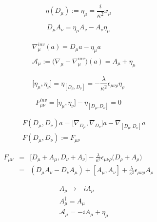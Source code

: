 \documentclass[10pt]{book}
\theoremstyle{break}
\begin{document}
\begin{equation*}
 \eta(D_\mu) := \eta_\mu = \frac{i}{\kappa^2} x_\mu
\end{equation*}

\begin{equation*}
 D_\mu A_\nu = \eta_\mu A_\nu - A_\nu \eta_\mu 
\end{equation*}

\begin{eqnarray*}
 && \nabla_{\mu}^{inv}(a) = D_{\mu}a - \eta_{\mu}a \\
 && \mathcal{A}_{\mu} := \bigg( \nabla_{\mu} - \nabla_{\mu}^{inv} \bigg) (a) = A_{\mu} + \eta_\mu
\end{eqnarray*}



\begin{equation*}
 \big[ \eta_\mu , \eta_\nu \big] = \eta_{[ D_\mu , D_\nu ]} =- \frac{\lambda}{\kappa^2} \epsilon_{\mu \nu \rho} \eta_\rho 
\end{equation*}

\begin{equation*}
 F^{inv}_{\mu \nu} = \big[ \eta_\mu , \eta_\nu \big] - \eta_{[ D_\mu , D_\nu ]} = 0
\end{equation*}

\begin{eqnarray*}
 && F( D_\mu , D_\nu )a = \big[ \nabla_{D_\mu} , \nabla_{D_\nu} \big] a - \nabla_{[{D_\mu},{D_\nu}]}a \\
 && F( D_\mu , D_\nu ) := F_{\mu \nu} \nonumber 
\end{eqnarray*}



\begin{eqnarray*}
  F_{\mu \nu} &=& \big[ D_{\mu} + A_{\mu} , D_{\nu} + A_{\nu} \big] - \frac{\lambda}{\kappa^2} \epsilon_{\mu \nu \rho} \big( D_{\rho} + A_{\rho} \big) \nonumber \\
              &=& (D_{\mu} A_{\nu}  -  D_{\nu} A_{\mu}) + [A_{\mu},A_{\nu}] + \frac{\lambda }{\kappa^{2}} \epsilon_{\mu \nu \rho} A_{\rho}
\end{eqnarray*}
 
\begin{eqnarray*}
 && A_{\mu} \rightarrow - i A_{\mu} \\
 && A_{\mu}^{\dagger} = A_{\mu} \nonumber \\
 && \mathcal{A}_{\mu} = -i A_{\mu} + \eta_\mu
\end{eqnarray*}
\end{document}
